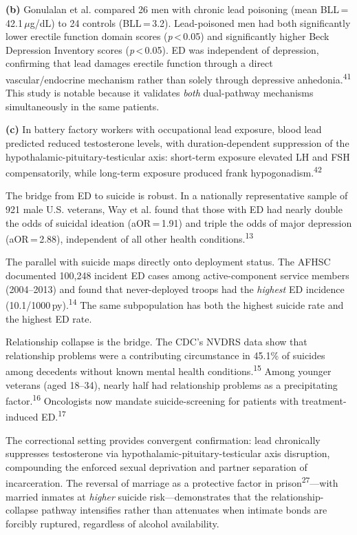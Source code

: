\documentclass[11pt,twocolumn]{article}
\begin{document}
\textbf{(b)} Gonulalan et al. compared 26 men with chronic lead poisoning (mean BLL\,=\,42.1\,$\mu$g/dL) to 24 controls (BLL\,=\,3.2). Lead-poisoned men had both significantly lower erectile function domain scores (\textit{p}\,<\,0.05) and significantly higher Beck Depression Inventory scores (\textit{p}\,<\,0.05). ED was independent of depression, confirming that lead damages erectile function through a direct vascular/endocrine mechanism rather than solely through depressive anhedonia.\textsuperscript{41} This study is notable because it validates \textit{both} dual-pathway mechanisms simultaneously in the same patients.

\textbf{(c)} In battery factory workers with occupational lead exposure, blood lead predicted reduced testosterone levels, with duration-dependent suppression of the hypothalamic-pituitary-testicular axis: short-term exposure elevated LH and FSH compensatorily, while long-term exposure produced frank hypogonadism.\textsuperscript{42}

The bridge from ED to suicide is robust. In a nationally representative sample of 921 male U.S. veterans, Way et al. found that those with ED had nearly double the odds of suicidal ideation (aOR\,=\,1.91) and triple the odds of major depression (aOR\,=\,2.88), independent of all other health conditions.\textsuperscript{13}

The parallel with suicide maps directly onto deployment status. The AFHSC documented 100,248 incident ED cases among active-component service members (2004--2013) and found that never-deployed troops had the \textit{highest} ED incidence (10.1/1000\,py).\textsuperscript{14} The same subpopulation has both the highest suicide rate and the highest ED rate.

Relationship collapse is the bridge. The CDC's NVDRS data show that relationship problems were a contributing circumstance in 45.1\% of suicides among decedents without known mental health conditions.\textsuperscript{15} Among younger veterans (aged 18--34), nearly half had relationship problems as a precipitating factor.\textsuperscript{16} Oncologists now mandate suicide-screening for patients with treatment-induced ED.\textsuperscript{17}

The correctional setting provides convergent confirmation: lead chronically suppresses testosterone via hypothalamic-pituitary-testicular axis disruption, compounding the enforced sexual deprivation and partner separation of incarceration. The reversal of marriage as a protective factor in prison\textsuperscript{27}---with married inmates at \textit{higher} suicide risk---demonstrates that the relationship-collapse pathway intensifies rather than attenuates when intimate bonds are forcibly ruptured, regardless of alcohol availability.
\end{document}
